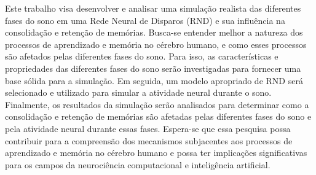 Este trabalho visa desenvolver e analisar uma simulação realista das diferentes fases do sono em uma Rede Neural de Disparos (RND)
e sua influência na consolidação e retenção de memórias. Busca-se entender melhor a natureza dos processos de aprendizado e
memória no cérebro humano, e como esses processos são afetados pelas diferentes fases do sono. Para isso, as características e
propriedades das diferentes fases do sono serão investigadas para fornecer uma base sólida para a simulação. Em seguida, um modelo
apropriado de RND será selecionado e utilizado para simular a atividade neural durante o sono. Finalmente, os resultados da
simulação serão analisados para determinar como a consolidação e retenção de memórias são afetadas pelas diferentes fases do sono
e pela atividade neural durante essas fases. Espera-se que essa pesquisa possa contribuir para a compreensão dos mecanismos
subjacentes aos processos de aprendizado e memória no cérebro humano e possa ter implicações significativas para os campos da
neurociência computacional e inteligência artificial.


